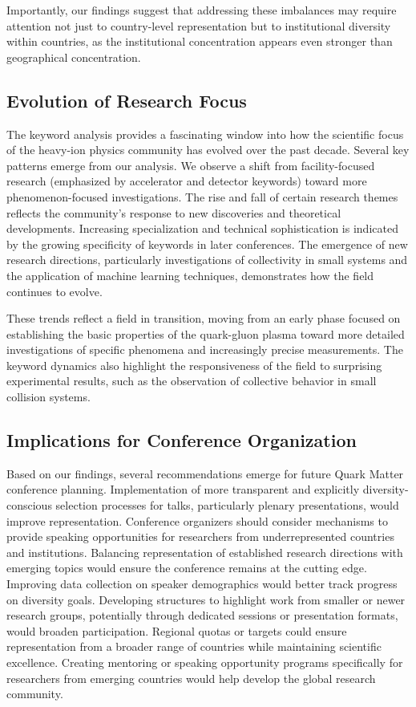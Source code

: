 \documentclass[a4paper,11pt]{article}
\begin{document}
Importantly, our findings suggest that addressing these imbalances may require attention not just to country-level representation but to institutional diversity within countries, as the institutional concentration appears even stronger than geographical concentration.

\subsection{Evolution of Research Focus}

The keyword analysis provides a fascinating window into how the scientific focus of the heavy-ion physics community has evolved over the past decade. Several key patterns emerge from our analysis. We observe a shift from facility-focused research (emphasized by accelerator and detector keywords) toward more phenomenon-focused investigations. The rise and fall of certain research themes reflects the community's response to new discoveries and theoretical developments. Increasing specialization and technical sophistication is indicated by the growing specificity of keywords in later conferences. The emergence of new research directions, particularly investigations of collectivity in small systems and the application of machine learning techniques, demonstrates how the field continues to evolve.

These trends reflect a field in transition, moving from an early phase focused on establishing the basic properties of the quark-gluon plasma toward more detailed investigations of specific phenomena and increasingly precise measurements. The keyword dynamics also highlight the responsiveness of the field to surprising experimental results, such as the observation of collective behavior in small collision systems.

\subsection{Implications for Conference Organization}

Based on our findings, several recommendations emerge for future Quark Matter conference planning. Implementation of more transparent and explicitly diversity-conscious selection processes for talks, particularly plenary presentations, would improve representation. Conference organizers should consider mechanisms to provide speaking opportunities for researchers from underrepresented countries and institutions. Balancing representation of established research directions with emerging topics would ensure the conference remains at the cutting edge. Improving data collection on speaker demographics would better track progress on diversity goals. Developing structures to highlight work from smaller or newer research groups, potentially through dedicated sessions or presentation formats, would broaden participation. Regional quotas or targets could ensure representation from a broader range of countries while maintaining scientific excellence. Creating mentoring or speaking opportunity programs specifically for researchers from emerging countries would help develop the global research community.
\end{document}
